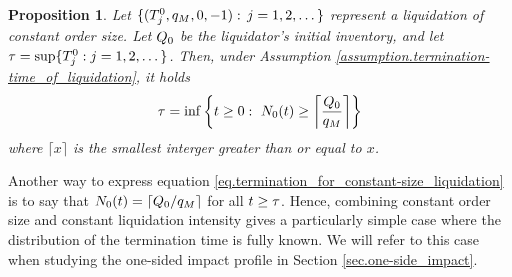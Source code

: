 \documentclass[10pt, article,table]{article}
\newtheorem{prop}[thm]{Proposition}
\begin{document}
\begin{prop}\label{prop.termination_for_constant-size_liquidation}
 Let $\lbrace (\arrivalTimes[0]_j, q_{M}, 0, -1): \, j=1,2,\dots\rbrace$ represent a liquidation of constant order size. Let $\metaorderSize$ be the liquidator's initial inventory, and let $\terminationTime = \sup\lbrace \arrivalTimes[0]_j : j=1,2,\dots\rbrace$. Then, under Assumption \ref{assumption.termination-time_of_liquidation}, it holds
 \begin{equation}\label{eq.termination_for_constant-size_liquidation}
 \terminationTime = \inf \left\lbrace t\geq 0: \, \, \countingProc[0](t)\geq 
 \left\lceil \frac{\metaorderSize}{q_{M}}\right\rceil \right\rbrace
 \end{equation}
 where $\lceil x\rceil$ is the smallest interger greater than or equal to $x$. 
\end{prop}

Another way to express equation \eqref{eq.termination_for_constant-size_liquidation} is to say that $\countingProc[0](t) = \lceil\metaorderSize/q_{M}\rceil$ for all $t\geq \terminationTime$.
Hence, combining constant order size and constant liquidation intensity gives a particularly simple case where the distribution of the termination time is fully known. We will refer to this case when studying the one-sided impact profile in Section \ref{sec.one-side_impact}.
\end{document}
